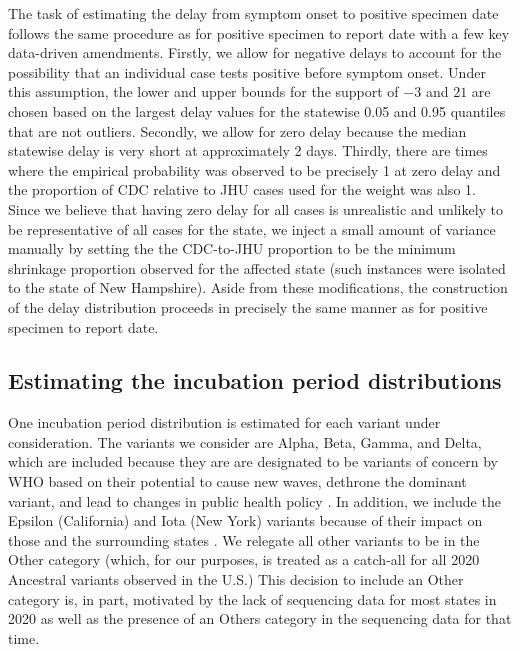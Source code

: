 \documentclass{article}
\begin{document}
The task of estimating the delay from symptom onset to positive specimen date follows the same procedure as for positive specimen to report date with a few key data-driven amendments. Firstly, we allow for negative delays to account for the possibility that an individual case tests positive before symptom onset. Under this assumption, the lower and upper bounds for the support of $-3$ and $21$ are chosen based on the largest delay values for the statewise 0.05 and 0.95 quantiles that are not outliers. Secondly, we allow for zero delay because the median statewise delay is very short at approximately 2 days. Thirdly, there are times where the empirical probability was observed to be precisely 1 at zero delay and the proportion of CDC relative to JHU cases used for the weight was also 1. Since we believe that having zero delay for all cases is unrealistic and unlikely to be representative of all cases for the state, we inject a small amount of variance manually by setting the the CDC-to-JHU proportion to be the minimum shrinkage proportion observed for the affected state (such instances were isolated to the state of New Hampshire). Aside from these modifications, the construction of the delay distribution proceeds in precisely the same manner as for positive specimen to report date. 

\subsection{Estimating the incubation period distributions} 

One incubation period distribution is estimated for each variant under consideration.
The variants we consider are Alpha, Beta, Gamma, and Delta, which are
 included because they are
are designated to be variants of concern by WHO based on their potential to
cause new waves, dethrone the dominant variant, and lead to changes in public
health policy \citep{who2021tracking}. In addition, we include the Epsilon
(California) and Iota (New York) variants because of their impact on those and
the surrounding states \citep{yang2022investigation, duerr2021dominance}. We
relegate all other variants to be in the Other category (which, for our purposes,
is treated as a catch-all for all 2020 Ancestral variants observed in the U.S.)
This decision to include an Other category is, in part,
motivated by the lack of sequencing data for most states in 2020 as well as the
presence of an Others category in the sequencing data for that time. 
\end{document}
